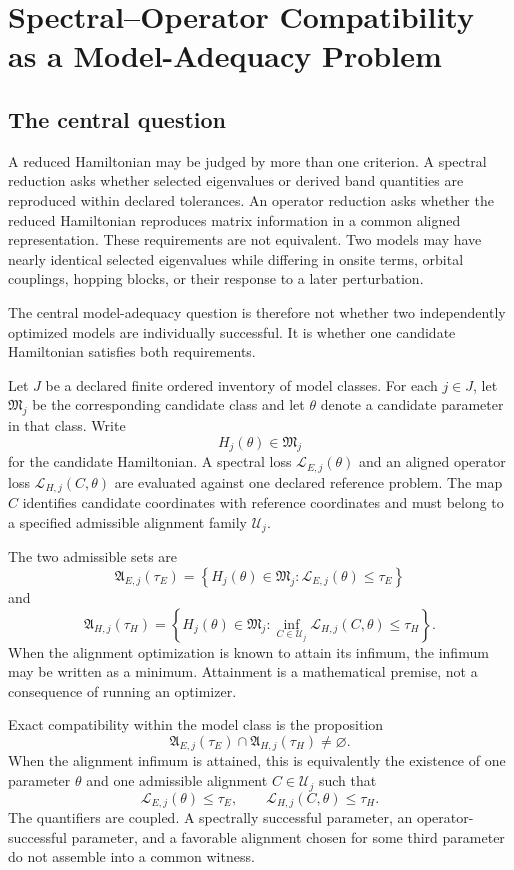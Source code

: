 \chapter{Spectral--Operator Compatibility as a Model-Adequacy Problem}
\label{ch:proof-architecture}

\section{The central question}

A reduced Hamiltonian may be judged by more than one criterion.  A spectral reduction
asks whether selected eigenvalues or derived band quantities are reproduced within
declared tolerances.  An operator reduction asks whether the reduced Hamiltonian
reproduces matrix information in a common aligned representation.  These requirements
are not equivalent.  Two models may have nearly identical selected eigenvalues while
differing in onsite terms, orbital couplings, hopping blocks, or their response to a
later perturbation.

The central model-adequacy question is therefore not whether two independently optimized
models are individually successful.  It is whether one candidate Hamiltonian satisfies
both requirements.

Let $J$ be a declared finite ordered inventory of model classes.  For each $j\in J$,
let $\mathfrak M_j$ be the corresponding candidate class and let $\theta$ denote a
candidate parameter in that class.  Write
\[
  H_j(\theta)\in\mathfrak M_j
\]
for the candidate Hamiltonian.  A spectral loss $\mathcal L_{E,j}(\theta)$ and an
aligned operator loss $\mathcal L_{H,j}(C,\theta)$ are evaluated against one declared
reference problem.  The map $C$ identifies candidate coordinates with reference
coordinates and must belong to a specified admissible alignment family
$\mathcal U_j$.

The two admissible sets are
\[
  \mathfrak A_{E,j}(\tau_E)
  =\left\{
      H_j(\theta)\in\mathfrak M_j:
      \mathcal L_{E,j}(\theta)\leq\tau_E
    \right\}
\]
and
\[
  \mathfrak A_{H,j}(\tau_H)
  =\left\{
      H_j(\theta)\in\mathfrak M_j:
      \inf_{C\in\mathcal U_j}
      \mathcal L_{H,j}(C,\theta)\leq\tau_H
    \right\}.
\]
When the alignment optimization is known to attain its infimum, the infimum may be
written as a minimum.  Attainment is a mathematical premise, not a consequence of
running an optimizer.

Exact compatibility within the model class is the proposition
\[
  \mathfrak A_{E,j}(\tau_E)
  \cap
  \mathfrak A_{H,j}(\tau_H)
  \neq\varnothing.
\]
When the alignment infimum is attained, this is equivalently the existence of one
parameter $\theta$ and one admissible alignment $C\in\mathcal U_j$ such that
\[
  \mathcal L_{E,j}(\theta)\leq\tau_E,
  \qquad
  \mathcal L_{H,j}(C,\theta)\leq\tau_H.
\]
The quantifiers are coupled.  A spectrally successful parameter, an operator-successful
parameter, and a favorable alignment chosen for some third parameter do not assemble
into a common witness.

